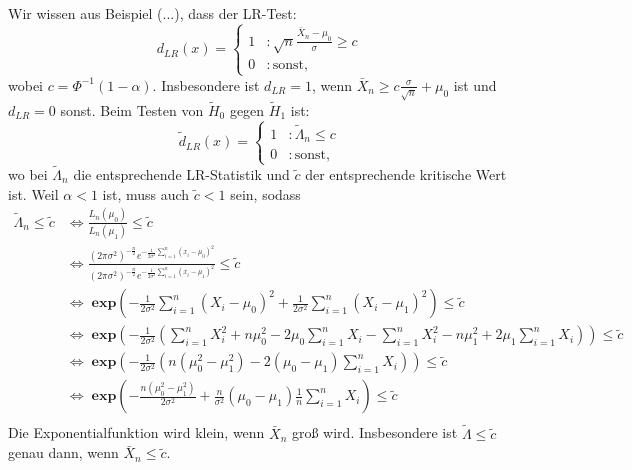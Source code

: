 \documentclass[10pt]{article}
\newcommand{\sni}{\sum_{i=1}^{n}} %
\newcommand{\dlr}{d_{LR}}%
\newenvironment{BWS}[1][]
{\begin{Beweis}[frametitle=#1]}{\end{Beweis}}
\begin{document}
\begin{BWS}[Beweis 2.1.2 (UMP z-Test)]
			Wir wissen aus Beispiel (...), dass der LR-Test:
			\begin{equation*}
				\dlr(x) = \begin{cases}
					1 &: \sqrt{n} \frac{\bar{X}_n - \mu_0}{\sigma} \geq c\\
					0 &: \text{sonst},
				\end{cases}
			\end{equation*}
			wobei $c = \Phi^{-1}(1-\alpha)$. Insbesondere ist $\dlr = 1$, wenn $\bar{X}_n \geq c \frac{\sigma}{\sqrt{n}}+ \mu_0$ ist und $\dlr = 0$ sonst. 
			Beim Testen von $\tilde{H}_0$ gegen $\tilde{H}_1$ ist: 
			\begin{equation*}
				\tilde{d}_{LR}(x) = \begin{cases}
					1 &: \tilde{\Lambda}_n \leq c\\
					0 &: \text{sonst},
				\end{cases}
			\end{equation*}
			wo bei $\tilde{\Lambda}_n$ die entsprechende LR-Statistik und $\tilde{c}$ der entsprechende kritische Wert ist. Weil $\alpha < 1$ ist, muss auch $\tilde{c} < 1$ sein, sodass
			\begin{equation*}
				\begin{split}
					\tilde{\Lambda}_n \leq \tilde{c} &\Leftrightarrow \frac{L_n(\mu_0)}{L_n(\mu_1)} \leq \tilde{c}\\
					&\Leftrightarrow \frac{(2 \pi \sigma^2)^{-\frac{n}{2}} e ^{- \frac{1}{2 \sigma^2}\sni(x_i - \mu_0)^2}}{(2 \pi \sigma^2)^{-\frac{n}{2}} e ^{- \frac{1}{2 \sigma^2}\sni(x_i - \mu_1)^2}} \leq \tilde{c}\\
					&\Leftrightarrow\;  \textbf{exp}\left(- \frac{1}{2 \sigma^2}\sni (X_i-\mu_0)^2 + \frac{1}{2 \sigma^2} \sni (X_i - \mu_1)^2\right) \leq \tilde{c}\\
					&\Leftrightarrow \; \textbf{exp}\left(- \frac{1}{2 \sigma^2} \left( \sni X_i^2 + n \mu_0^2 - 2 \mu_0\sni X_i - \sni X_i^2 - n\mu_1^2 + 2\mu_1 \sni X_i\right)\right) \leq \tilde{c}\\
					&\Leftrightarrow \; \textbf{exp}\left(- \frac{1}{2 \sigma^2} \left( n ( \mu_0^2 - \mu_1^2) -2(\mu_0 - \mu_1) \sni X_i\right)\right) \leq \tilde{c}\\
					&\Leftrightarrow \; \textbf{exp}\left(- \frac{n(\mu_0^2 - \mu_1^2)}{2 \sigma^2} + \frac{n}{\sigma^2}(\mu_0 - \mu_1) \frac{1}{n} \sni X_i\right) \leq \tilde{c}\\
				\end{split}
			\end{equation*}
			Die Exponentialfunktion wird klein, wenn $\bar{X}_n$ groß wird. Insbesondere ist $\tilde{\Lambda} \leq \tilde{c}$ genau dann, wenn $\bar{X}_n \leq \tilde{c}$.

\end{BWS}
\end{document}
